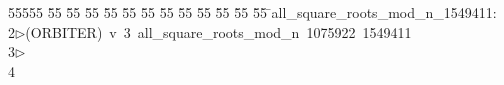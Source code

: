 %
%
\begin{tabbing}
55555 \= 55 \= 55 \= 55 \= 55 \= 55 \= 55 \= 55 \= 55 \= 55 \= 55 \= 55 \= 55 \= \>all\_square\_roots\_mod\_n\_1549411:\\[0pt]
2\>$\triangleright$\>(ORBITER)\ v\ 3\ all\_square\_roots\_mod\_n\ 1075922\ 1549411\\[0pt]
3\>$\triangleright$\>\\[0pt]
4\>\end{tabbing}
